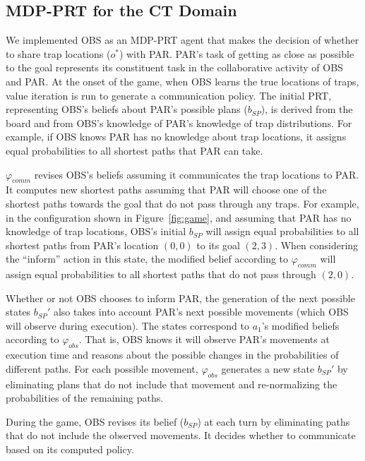 \subsection{MDP-PRT for the CT Domain}
 We implemented OBS as an MDP-PRT agent that makes the decision of whether to share trap locations ($o^*$) with PAR. PAR's task of getting as close as possible to the goal represents its constituent task in the collaborative activity of OBS and PAR. At the onset of the game, when OBS learns the true locations of traps, value iteration is run to generate a communication policy. 
  The initial PRT, representing OBS's beliefs  about PAR's possible plans ($b_{SP}$), is derived from the board and from OBS's knowledge of PAR's knowledge of trap distributions. For example, if OBS knows PAR has no knowledge about trap locations,  it assigns equal probabilities to all shortest paths that PAR can take. 
  
$\varphi_{comm}$ revises  OBS's beliefs assuming it communicates the trap locations to PAR. It computes new shortest paths assuming that PAR will choose one of the shortest paths towards the goal that do not pass through any traps. For example, in the configuration shown in Figure~\ref{fig:game}, and assuming that PAR has no knowledge of trap locations, OBS's initial  $b_{SP}$ will assign equal probabilities to all shortest paths from PAR's location $(0,0)$ to its goal $(2,3)$. When considering the ``inform'' action in this state,
  the modified belief according to $\varphi_{comm}$ will assign equal probabilities to all shortest paths that do not pass through $(2,0)$. 
   
   Whether or not OBS chooses to inform PAR, the generation of the next possible states ${b_{SP}}'$ also takes into account PAR's next possible movements (which OBS will observe during execution). The states correspond to $a_1$'s modified beliefs according to $\varphi_{obs}$. That is, OBS knows it will observe PAR's movements at execution time and reasons about the possible changes in the probabilities of different paths. For each possible movement, $\varphi_{obs}$ generates a new state ${b_{SP}}'$ by eliminating plans that do not include that movement and re-normalizing the probabilities of the remaining paths.   
   
   During the game, OBS revises its belief (${b}_{SP}$) at each turn by eliminating paths that do not include the observed movements. It decides whether to communicate based on its computed policy.
   
